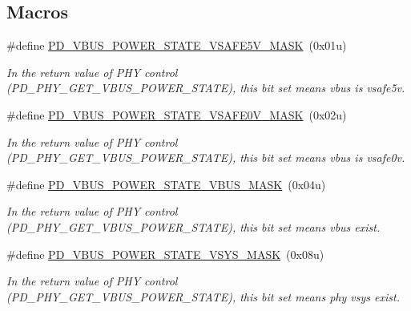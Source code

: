 \subsection*{Macros}
\begin{DoxyCompactItemize}
\item 
\#define \hyperlink{group__usb__pd__phy__drv_ga1f2e4aed47a47caec2aba9edb2236e42}{P\-D\-\_\-\-V\-B\-U\-S\-\_\-\-P\-O\-W\-E\-R\-\_\-\-S\-T\-A\-T\-E\-\_\-\-V\-S\-A\-F\-E5\-V\-\_\-\-M\-A\-S\-K}~(0x01u)
\begin{DoxyCompactList}\small\item\em In the return value of P\-H\-Y control (P\-D\-\_\-\-P\-H\-Y\-\_\-\-G\-E\-T\-\_\-\-V\-B\-U\-S\-\_\-\-P\-O\-W\-E\-R\-\_\-\-S\-T\-A\-T\-E), this bit set means vbus is vsafe5v. \end{DoxyCompactList}\item 
\#define \hyperlink{group__usb__pd__phy__drv_gabf05bb09647628f3556c817e1f059175}{P\-D\-\_\-\-V\-B\-U\-S\-\_\-\-P\-O\-W\-E\-R\-\_\-\-S\-T\-A\-T\-E\-\_\-\-V\-S\-A\-F\-E0\-V\-\_\-\-M\-A\-S\-K}~(0x02u)
\begin{DoxyCompactList}\small\item\em In the return value of P\-H\-Y control (P\-D\-\_\-\-P\-H\-Y\-\_\-\-G\-E\-T\-\_\-\-V\-B\-U\-S\-\_\-\-P\-O\-W\-E\-R\-\_\-\-S\-T\-A\-T\-E), this bit set means vbus is vsafe0v. \end{DoxyCompactList}\item 
\#define \hyperlink{group__usb__pd__phy__drv_gabe6758409c7aeff91de688fe7cefa195}{P\-D\-\_\-\-V\-B\-U\-S\-\_\-\-P\-O\-W\-E\-R\-\_\-\-S\-T\-A\-T\-E\-\_\-\-V\-B\-U\-S\-\_\-\-M\-A\-S\-K}~(0x04u)
\begin{DoxyCompactList}\small\item\em In the return value of P\-H\-Y control (P\-D\-\_\-\-P\-H\-Y\-\_\-\-G\-E\-T\-\_\-\-V\-B\-U\-S\-\_\-\-P\-O\-W\-E\-R\-\_\-\-S\-T\-A\-T\-E), this bit set means vbus exist. \end{DoxyCompactList}\item 
\#define \hyperlink{group__usb__pd__phy__drv_gaa02e3880c4e9954439522efb9a6af5c5}{P\-D\-\_\-\-V\-B\-U\-S\-\_\-\-P\-O\-W\-E\-R\-\_\-\-S\-T\-A\-T\-E\-\_\-\-V\-S\-Y\-S\-\_\-\-M\-A\-S\-K}~(0x08u)
\begin{DoxyCompactList}\small\item\em In the return value of P\-H\-Y control (P\-D\-\_\-\-P\-H\-Y\-\_\-\-G\-E\-T\-\_\-\-V\-B\-U\-S\-\_\-\-P\-O\-W\-E\-R\-\_\-\-S\-T\-A\-T\-E), this bit set means phy vsys exist. \end{DoxyCompactList}\end{DoxyCompactItemize}
